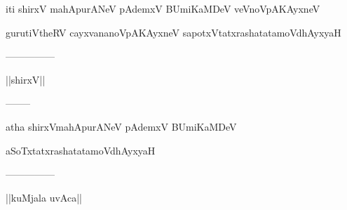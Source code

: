 \documentclass{article}
\begin{document}
\begin{center}
iti shirxV mahApurANeV pAdemxV BUmiKaMDeV veVnoVpAKAyxneV
\end{center}

\begin{center}
gurutiVtheRV cayxvananoVpAKAyxneV sapotxVtatxrashatatamoVdhAyxyaH
\end{center}

\begin{center}
---------------
\end{center}

\begin{center}
||shirxV||
\end{center}

\begin{center}
--------
\end{center}

\begin{center}
atha shirxVmahApurANeV pAdemxV BUmiKaMDeV
\end{center}

\begin{center}
aSoTxtatxrashatatamoVdhAyxyaH
\end{center}

\begin{center}
---------------
\end{center}

\begin{center}
||kuMjala uvAca||
\end{center}
\end{document}
